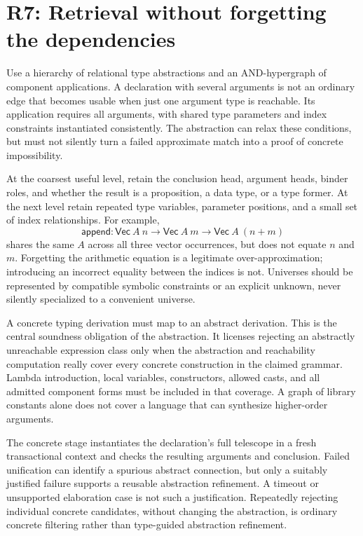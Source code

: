 \section{R7: Retrieval without forgetting the dependencies}\label{sec:retrieval}


\answer Use a hierarchy of relational type abstractions and an AND-hypergraph of component applications. A declaration with several arguments is not an ordinary edge that becomes usable when just one argument type is reachable. Its application requires all arguments, with shared type parameters and index constraints instantiated consistently. The abstraction can relax these conditions, but must not silently turn a failed approximate match into a proof of concrete impossibility.

At the coarsest useful level, retain the conclusion head, argument heads, binder roles, and whether the result is a proposition, a data type, or a type former. At the next level retain repeated type variables, parameter positions, and a small set of index relationships. For example,
\[
 \mathsf{append}:\mathsf{Vec}\ A\ n\to\mathsf{Vec}\ A\ m
          \to\mathsf{Vec}\ A\ (n+m)
\]
shares the same $A$ across all three vector occurrences, but does not equate $n$ and $m$. Forgetting the arithmetic equation is a legitimate over-approximation; introducing an incorrect equality between the indices is not. Universes should be represented by compatible symbolic constraints or an explicit unknown, never silently specialized to a convenient universe.

A concrete typing derivation must map to an abstract derivation. This is the central soundness obligation of the abstraction. It licenses rejecting an abstractly unreachable expression class only when the abstraction and reachability computation really cover every concrete construction in the claimed grammar. Lambda introduction, local variables, constructors, allowed casts, and all admitted component forms must be included in that coverage. A graph of library constants alone does not cover a language that can synthesize higher-order arguments.

The concrete stage instantiates the declaration's full telescope in a fresh transactional context and checks the resulting arguments and conclusion. Failed unification can identify a spurious abstract connection, but only a suitably justified failure supports a reusable abstraction refinement. A timeout or unsupported elaboration case is not such a justification. Repeatedly rejecting individual concrete candidates, without changing the abstraction, is ordinary concrete filtering rather than type-guided abstraction refinement.

